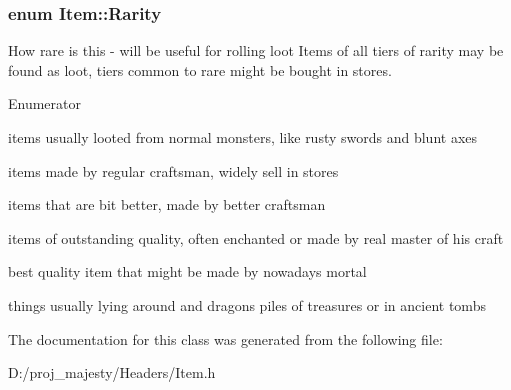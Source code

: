 \subsubsection[{\texorpdfstring{Rarity}{Rarity}}]{\setlength{\rightskip}{0pt plus 5cm}enum {\bf Item\+::\+Rarity}\hspace{0.3cm}{\ttfamily [protected]}}\hypertarget{class_item_ab29041c9ccfd11419abe6f39ac90bb6a}{}\label{class_item_ab29041c9ccfd11419abe6f39ac90bb6a}
How rare is this -\/ will be useful for rolling loot Items of all tiers of rarity may be found as loot, tiers common to rare might be bought in stores. \begin{Desc}
\item[Enumerator]\par
\begin{description}
\item[{\em 
poor\hypertarget{class_item_ab29041c9ccfd11419abe6f39ac90bb6aa6c9a50ca47b7a35469e9ba7feafe0c02}{}\label{class_item_ab29041c9ccfd11419abe6f39ac90bb6aa6c9a50ca47b7a35469e9ba7feafe0c02}
}]items usually looted from normal monsters, like rusty swords and blunt axes \item[{\em 
common\hypertarget{class_item_ab29041c9ccfd11419abe6f39ac90bb6aa500ded4262e0d28d13fa893e29e4663c}{}\label{class_item_ab29041c9ccfd11419abe6f39ac90bb6aa500ded4262e0d28d13fa893e29e4663c}
}]items made by regular craftsman, widely sell in stores \item[{\em 
uncommon\hypertarget{class_item_ab29041c9ccfd11419abe6f39ac90bb6aa8f0fcc9917f33df2de8d655460e28e9f}{}\label{class_item_ab29041c9ccfd11419abe6f39ac90bb6aa8f0fcc9917f33df2de8d655460e28e9f}
}]items that are bit better, made by better craftsman \item[{\em 
rare\hypertarget{class_item_ab29041c9ccfd11419abe6f39ac90bb6aa129fb8ce09940319e8cb9a83d76224d6}{}\label{class_item_ab29041c9ccfd11419abe6f39ac90bb6aa129fb8ce09940319e8cb9a83d76224d6}
}]items of outstanding quality, often enchanted or made by real master of his craft \item[{\em 
epic\hypertarget{class_item_ab29041c9ccfd11419abe6f39ac90bb6aa673dee240d5464c9281f768c1699258b}{}\label{class_item_ab29041c9ccfd11419abe6f39ac90bb6aa673dee240d5464c9281f768c1699258b}
}]best quality item that might be made by nowadays mortal \item[{\em 
legendary\hypertarget{class_item_ab29041c9ccfd11419abe6f39ac90bb6aaacb632a48a05151530bce1df85b0fdbb}{}\label{class_item_ab29041c9ccfd11419abe6f39ac90bb6aaacb632a48a05151530bce1df85b0fdbb}
}]things usually lying around and dragon\textquotesingle{}s piles of treasures or in ancient tombs \end{description}
\end{Desc}


The documentation for this class was generated from the following file\+:\begin{DoxyCompactItemize}
\item 
D\+:/proj\+\_\+majesty/\+Headers/Item.\+h\end{DoxyCompactItemize}
